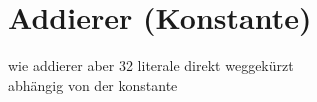 \section{Addierer (Konstante)}


wie addierer aber 32 literale direkt weggekürzt\\
abhängig von der konstante